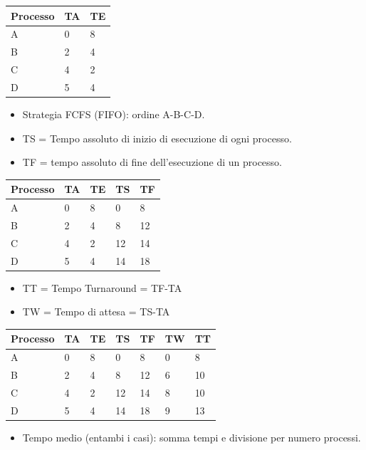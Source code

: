 \documentclass{article}
\begin{document}
\vskip 0.3cm
\begin{tabular}{|p{}|p{}|p{}|}
\hline
Processo        & TA              & TE      \\
\hline
A            & 0             & 8      \\
B            & 2             & 4      \\
C            & 4             & 2      \\
D            & 5             & 4      \\
\hline
\end{tabular}

\begin{itemize}
\item  Strategia FCFS (FIFO): ordine A-B-C-D.
\item  TS = Tempo assoluto di inizio di esecuzione di ogni processo.
\item  TF = tempo assoluto di fine dell’esecuzione di un processo.
\end{itemize}
\vskip 0.3cm
\begin{tabular}{|p{}|p{}|p{}|p{}|p{}|}
\hline
Processo        & TA              & TE      & TS      & TF      \\
\hline
A            & 0             & 8      & 0      & 8      \\
B            & 2             & 4      & 8      & 12      \\
C            & 4             & 2      & 12      & 14      \\
D            & 5             & 4      & 14      & 18      \\
\hline
\end{tabular}

\begin{itemize}
\item  TT = Tempo Turnaround = TF-TA
\item  TW = Tempo di attesa = TS-TA
\end{itemize}

\vskip 0.3cm
\begin{tabular}{|p{}|p{}|p{}|p{}|p{}|p{}|p{}|}
\hline
Processo        & TA              & TE      & TS      & TF     & TW      & TT       \\
\hline
A            & 0             & 8      & 0      & 8       & 0  & 8 \\
B            & 2             & 4      & 8      & 12       & 6  & 10 \\
C            & 4             & 2      & 12      & 14      & 8  & 10 \\
D            & 5             & 4      & 14      & 18       & 9  & 13 \\
\hline
\end{tabular}
\begin{itemize}
\item Tempo medio (entambi i casi): somma tempi e divisione per numero
processi.
\end{itemize}
\end{document}

